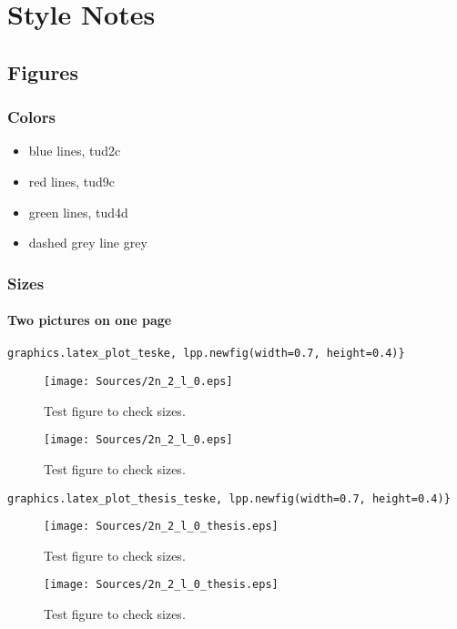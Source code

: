 \chapter{Style Notes}

\section{Figures}
\subsection{Colors}

\begin{itemize}
	\item blue lines, \textcolor{tud2c}{tud2c}
	\item red lines, \textcolor{tud9c}{tud9c}
	\item green lines, \textcolor{tud4d}{tud4d}
	\item dashed grey line grey
\end{itemize}

\subsection{Sizes}
\newpage
\subsubsection{Two pictures on one page}
\begin{verbatim}
graphics.latex_plot_teske, lpp.newfig(width=0.7, height=0.4)}
\end{verbatim}
\begin{figure}[htb]
\centering
\texttt{[image: Sources/2n\_2\_l\_0.eps]} 
\caption{Test figure to check sizes.}
\texttt{[image: Sources/2n\_2\_l\_0.eps]} 
\caption{Test figure to check sizes.}
\end{figure}
\newpage
\begin{verbatim}
graphics.latex_plot_thesis_teske, lpp.newfig(width=0.7, height=0.4)}
\end{verbatim}
\begin{figure}[htb]
\centering
\texttt{[image: Sources/2n\_2\_l\_0\_thesis.eps]} 
\caption{Test figure to check sizes.}
\texttt{[image: Sources/2n\_2\_l\_0\_thesis.eps]} 
\caption{Test figure to check sizes.}
\end{figure}
